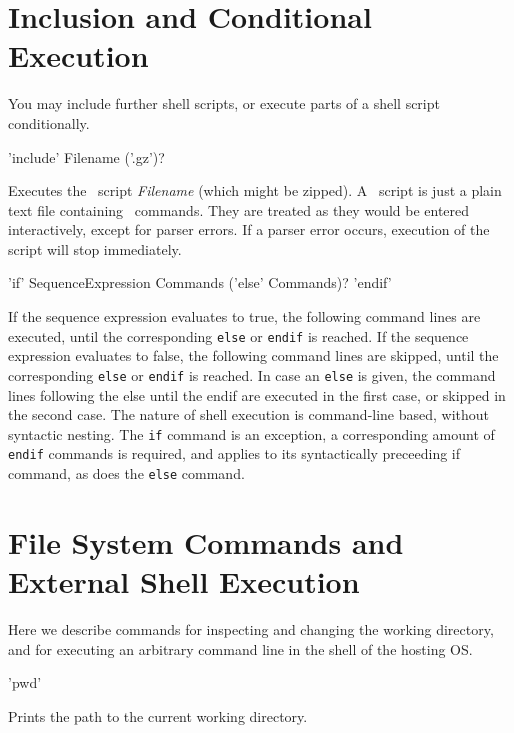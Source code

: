 \section{Inclusion and Conditional Execution}
\label{inclcondexeccommands}

You may include further shell scripts, or execute parts of a shell script conditionally.

\begin{rail}
  'include' Filename ('.gz')?
\end{rail}
Executes the \GrShell\ script \emph{Filename} (which might be zipped).
A \GrShell\ script is just a plain text file containing \GrShell\ commands.
They are treated as they would be entered interactively, except for parser errors.
If a parser error occurs, execution of the script will stop immediately.

\begin{rail}
  'if' SequenceExpression Commands ('else' Commands)? 'endif'
\end{rail}
If the sequence expression evaluates to true, the following command lines are executed, until the corresponding \texttt{else} or \texttt{endif} is reached.
If the sequence expression evaluates to false, the following command lines are skipped, until the corresponding \texttt{else} or \texttt{endif} is reached. 
In case an \texttt{else} is given, the command lines following the else until the endif are executed in the first case, or skipped in the second case.
The nature of shell execution is command-line based, without syntactic nesting.
The \texttt{if} command is an exception, a corresponding amount of \texttt{endif} commands is required, and applies to its syntactically preceeding if command, as does the \texttt{else} command. 


\section{File System Commands and External Shell Execution}
\label{filesyscommandsextex}

Here we describe commands for inspecting and changing the working directory, and for executing an arbitrary command line in the shell of the hosting OS.

\begin{rail}
  'pwd'
\end{rail}
Prints the path to the current working directory.

